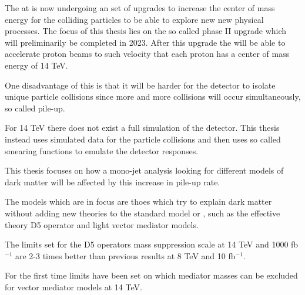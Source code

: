 The \abbrLHC at \abbrCERN is now undergoing an set of upgrades to increase the center of mass energy for the colliding particles to be able to explore new new physical processes. The focus of this thesis lies on the so called phase II upgrade which will preliminarily be completed in 2023. After this upgrade the \abbrLHC will be able to accelerate proton beams to such velocity that each proton has a center of mass energy of 14 TeV.

One disadvantage of this is that it will be harder for the \abbrATLAS detector to isolate unique particle collisions since more and more collisions will occur simultaneously, so called pile-up. 

For 14 TeV there does not exist a full simulation of the \abbrATLAS detector. This thesis instead uses simulated data for the particle collisions and then uses so called smearing functions to emulate the detector responses. 

This thesis focuses on how a mono-jet analysis looking for different \abbrWIMP models of dark matter will be affected by this increase in pile-up rate.

The models which are in focus are thoes which try to explain dark matter without adding new theories to the standard model or \abbrQFT , such as the effective theory D5 operator and light vector mediator models.

The limits set for the D5 operators mass suppression scale at 14 TeV and 1000 fb$^{-1}$ are 2-3 times better than previous results at 8 TeV and 10 fb$^{-1}$. 

For the first time limits have been set on which mediator masses can be excluded for vector mediator models at 14 TeV.